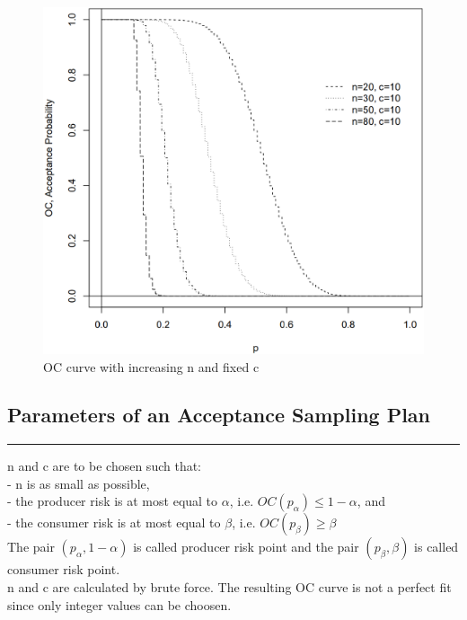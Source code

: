 \begin{figure}[H]
  \centering
  \includegraphics[width=0.8\linewidth]{Pics/5.1.3.png}
  \caption{OC curve with increasing n and fixed c}
\end{figure}

\subsection{Parameters of an Acceptance Sampling Plan}
\noindent\rule[\linienAbstand]{\linewidth}{\linienDicke}
n and c are to be chosen such that:\\
- n is as small as possible,\\
- the producer risk is at most equal to $\alpha$, i.e. $OC(p_{\alpha}) \leq 1 - \alpha$, and\\
- the consumer risk is at most equal to $\beta$, i.e. $OC(p_{\beta}) \geq \beta$\\

The pair $(p_{\alpha}, 1-\alpha)$ is called producer risk point and the pair $(p_{\beta}, \beta)$ is called consumer risk point.\\
n and c are calculated by brute force. The resulting OC curve is not a perfect fit since only integer values can be choosen.\\

